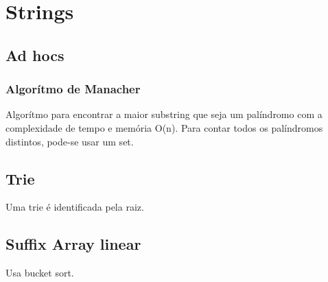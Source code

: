 \section{Strings}

\subsection{Ad hocs}
\subsubsection{Algorítmo de Manacher}
Algor\'{i}tmo para encontrar a maior substring que seja um pal\'{i}ndromo com a complexidade de tempo e mem\'{o}ria O(n).
Para contar todos os palíndromos distintos, pode-se usar um set.

\divisor
\subsection{Trie}
Uma trie \'{e} identificada pela raiz.

\divisor

\subsection{Suffix Array linear}

Usa bucket sort.

